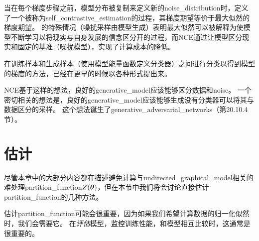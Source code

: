当在每个梯度步骤之前，模型分布被复制来定义新的\gls{noise_distribution}时，定义了一个被称为\gls{self_contrastive_estimation}的过程，其梯度期望等价于最大似然的梯度期望\citep{Goodfellow-ICLR2015}。
的特殊情况（噪扰采样由模型生成）表明最大似然可以被解释为使模型不断学习以将现实与自身发展的信念区分开的过程，而\gls{NCE}通过让模型区分现实和固定的基准（噪扰模型），实现了计算成本的降低。


在训练样本和生成样本（使用模型能量函数定义分类器）之间进行分类以得到模型的梯度的方法，已经在更早的时候以各种形式提出来\citep{Welling2003b,Bengio-2009-book}。


\gls{NCE}基于这样的想法，良好的\gls{generative_model}应该能够区分数据和\gls{noise}。
一个密切相关的想法是，良好的\gls{generative_model}应该能够生成没有分类器可以将其与数据区分的采样。
这个想法诞生了\gls{generative_adversarial_networks}（第20.10.4节）。


\section{估计}
\label{sec:estimating_the_partition_function}
尽管本章中的大部分内容都在描述避免计算与\gls{undirected_graphical_model}相关的难处理\gls{partition_function}$Z(\boldsymbol{\theta})$，但在本节中我们将会讨论直接估计\gls{partition_function}的几种方法。


估计\gls{partition_function}可能会很重要，因为如果我们希望计算数据的归一化似然时，我们会需要它。
在\emph{评估}模型，监控训练性能，和模型相互比较时，这通常是很重要的。


